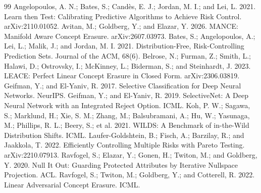 \documentclass[letterpaper]{article}
\begin{document}
\begin{thebibliography}{99}
Angelopoulos, A. N.; Bates, S.; Cand\`es, E. J.; Jordan, M. I.; and Lei, L.
2021. Learn then Test: Calibrating Predictive Algorithms to Achieve Risk
Control. arXiv:2110.01052.
Avitan, M.; Goldberg, Y.; and Elazar, Y. 2026. MANCE: Manifold Aware Concept
Erasure. arXiv:2607.03973.
Bates, S.; Angelopoulos, A.; Lei, L.; Malik, J.; and Jordan, M. I. 2021.
Distribution-Free, Risk-Controlling Prediction Sets. Journal of the ACM,
68(6).
Belrose, N.; Furman, Z.; Smith, L.; Halawi, D.; Ostrovsky, I.; McKinney, L.;
Biderman, S.; and Steinhardt, J. 2023. LEACE: Perfect Linear Concept Erasure
in Closed Form. arXiv:2306.03819.
Geifman, Y.; and El-Yaniv, R. 2017. Selective Classification for Deep Neural
Networks. NeurIPS.
Geifman, Y.; and El-Yaniv, R. 2019. SelectiveNet: A Deep Neural Network with
an Integrated Reject Option. ICML.
Koh, P. W.; Sagawa, S.; Marklund, H.; Xie, S. M.; Zhang, M.; Balsubramani, A.;
Hu, W.; Yasunaga, M.; Phillips, R. L.; Beery, S.; et al. 2021. WILDS: A
Benchmark of in-the-Wild Distribution Shifts. ICML.
Laufer-Goldshtein, B.; Fisch, A.; Barzilay, R.; and Jaakkola, T. 2022.
Efficiently Controlling Multiple Risks with Pareto Testing. arXiv:2210.07913.
Ravfogel, S.; Elazar, Y.; Gonen, H.; Twiton, M.; and Goldberg, Y. 2020. Null It
Out: Guarding Protected Attributes by Iterative Nullspace Projection. ACL.
Ravfogel, S.; Twiton, M.; Goldberg, Y.; and Cotterell, R. 2022. Linear
Adversarial Concept Erasure. ICML.
\end{thebibliography}
\end{document}
